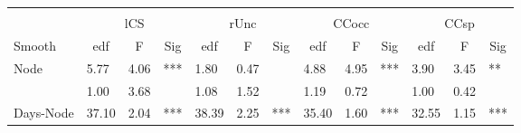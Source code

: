 \begin{tabular}{lllllllllllll}
 &  &  &  &  &  &  &  &  &  &  &  &  \\
 & \multicolumn{3}{c|}{lCS} & \multicolumn{3}{c|}{rUnc} & \multicolumn{3}{c|}{CCocc} & \multicolumn{3}{c}{CCsp} \\ \cline{2-13}
Smooth & \multicolumn{1}{c}{edf} & \multicolumn{1}{c}{F} & \multicolumn{1}{c|}{Sig} & \multicolumn{1}{c}{edf} & \multicolumn{1}{c}{F} & \multicolumn{1}{c|}{Sig} & \multicolumn{1}{c}{edf} & \multicolumn{1}{c}{F} & \multicolumn{1}{c|}{Sig} & \multicolumn{1}{c}{edf} & \multicolumn{1}{c}{F} & \multicolumn{1}{c}{Sig} \\ \hline
\multicolumn{1}{l|}{Node} & 5.77 & 4.06 & \multicolumn{1}{l|}{***} & 1.80 & 0.47 & \multicolumn{1}{l|}{} & 4.88 & 4.95 & \multicolumn{1}{l|}{***} & 3.90 & 3.45 & ** \\
\rowcolor[HTML]{C0C0C0}
\multicolumn{1}{l|}{\cellcolor[HTML]{C0C0C0}Days} & 1.00 & 3.68 & \multicolumn{1}{l|}{\cellcolor[HTML]{C0C0C0}} & 1.08 & 1.52 & \multicolumn{1}{l|}{\cellcolor[HTML]{C0C0C0}} & 1.19 & 0.72 & \multicolumn{1}{l|}{\cellcolor[HTML]{C0C0C0}} & 1.00 & 0.42 &  \\
\multicolumn{1}{l|}{Days-Node} & 37.10 & 2.04 & \multicolumn{1}{l|}{***} & 38.39 & 2.25 & \multicolumn{1}{l|}{***} & 35.40 & 1.60 & \multicolumn{1}{l|}{***} & 32.55 & 1.15 & ***
\end{tabular}
